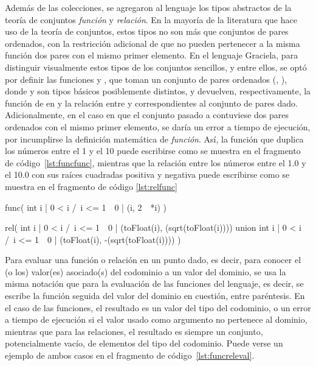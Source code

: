 Además de las colecciones, se agregaron al lenguaje los tipos abstractos de la
teoría de conjuntos \textit{función} y \textit{relación}. En la mayoría de la
literatura que hace uso de la teoría de conjuntos, estos tipos no son más que
conjuntos de pares ordenados, con la restricción adicional de que no pueden
pertenecer a la misma función dos pares con el mismo primer elemento. En el
lenguaje Graciela, para distinguir visualmente estos tipos de los conjuntos
sencillos, y entre ellos, se optó por definir las funciones  y
, que toman un conjunto de pares ordenados (, ),
donde  y  son tipos básicos posiblemente distintos, y
devuelven, respectivamente, la función de  en  y la relación
entre  y  correspondientes al conjunto de pares dado.
Adicionalmente, en el caso en que el conjunto pasado a  contuviese
dos pares ordenados con el mismo primer elemento, se daría un error a tiempo de
ejecución, por incumplirse la definición matemática de \textit{función}. Así, la
función que duplica los números entre el 1 y el 10 puede escribirse como se
muestra en el fragmento de código~\ref{lst:funcfunc}, mientras que la relación
entre los números entre el 1.0 y el 10.0 con sus raíces cuadradas positiva y
negativa puede escribirse como se muestra en el fragmento de código
\ref{lst:relfunc}

\begin{gracielacode}[caption=Expresión de tipo \textit{función}, label=lst:funcfunc]
func({ int i | 0 < i /\ i <= 1~~0 | (i, 2~~*i) })
\end{gracielacode}

\begin{gracielacode}[caption=Expresión de tipo \textit{relación}, label=lst:relfunc]
rel(
  { int i | 0 < i /\ i <= 1~~0 |
    (toFloat(i),  (sqrt(toFloat(i))))
  } union
  { int i | 0 < i /\ i <= 1~~0 |
    (toFloat(i), -(sqrt(toFloat(i))))
  }
)
\end{gracielacode}

Para evaluar una función o relación en un punto dado, es decir, para conocer el
(o los) valor(es) asociado(s) del codominio a un valor del dominio, se usa la
misma notación que para la evaluación de las funciones del lenguaje, es decir,
se escribe la función seguida del valor del dominio en cuestión, entre
paréntesis. En el caso de las funciones, el resultado es un valor del tipo del
codominio, o un error a tiempo de ejecución si el valor usado como argumento no
pertenece al dominio, mientras que para las relaciones, el resultado es siempre
un conjunto, potencialmente vacío, de elementos del tipo del codominio. Puede
verse un ejemplo de ambos casos en el fragmento de código~\ref{lst:funcreleval}.

